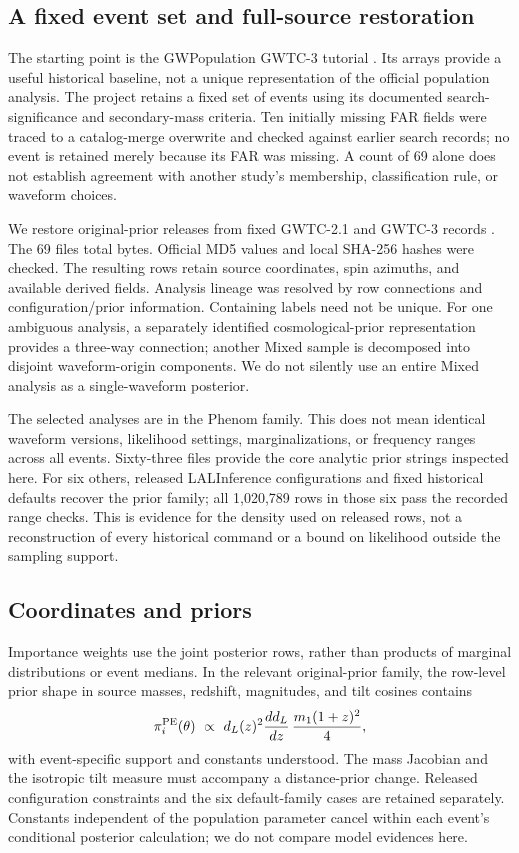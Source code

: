 \subsection{A fixed event set and full-source restoration}
The starting point is the GWPopulation GWTC-3 tutorial \cite{tutorial}. Its arrays provide a useful historical baseline, not a unique representation of the official population analysis. The project retains a fixed set of \DataEvents{} events using its documented search-significance and secondary-mass criteria. Ten initially missing FAR fields were traced to a catalog-merge overwrite and checked against earlier search records; no event is retained merely because its FAR was missing. A count of 69 alone does not establish agreement with another study's membership, classification rule, or waveform choices.

We restore original-prior releases from fixed GWTC-2.1 and GWTC-3 records \cite{pe21,pe3}. The 69 files total \DataBytes{} bytes. Official MD5 values and local SHA-256 hashes were checked. The resulting \DataRows{} rows retain source coordinates, spin azimuths, and available derived fields. Analysis lineage was resolved by row connections and configuration/prior information. Containing labels need not be unique. For one ambiguous analysis, a separately identified cosmological-prior representation provides a three-way connection; another Mixed sample is decomposed into disjoint waveform-origin components. We do not silently use an entire Mixed analysis as a single-waveform posterior.

The selected analyses are in the Phenom family. This does not mean identical waveform versions, likelihood settings, marginalizations, or frequency ranges across all events. Sixty-three files provide the core analytic prior strings inspected here. For six others, released LALInference configurations and fixed historical defaults recover the prior family; all 1,020,789 rows in those six pass the recorded range checks. This is evidence for the density used on released rows, not a reconstruction of every historical command or a bound on likelihood outside the sampling support.

\subsection{Coordinates and priors}
Importance weights use the joint posterior rows, rather than products of marginal distributions or event medians. In the relevant original-prior family, the row-level prior shape in source masses, redshift, magnitudes, and tilt cosines contains
\begin{equation}
 \pi_i^{\rm PE}(\theta)\ \propto\ d_L(z)^2\frac{d d_L}{dz}\,
 \frac{m_1(1+z)^2}{4},\label{eq:prior}
\end{equation}
with event-specific support and constants understood. The mass Jacobian and the isotropic tilt measure must accompany a distance-prior change. Released configuration constraints and the six default-family cases are retained separately. Constants independent of the population parameter cancel within each event's conditional posterior calculation; we do not compare model evidences here.

